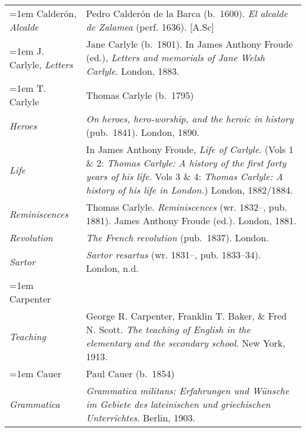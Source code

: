 \begin{xltabular}{\textwidth}{ lQ }
\hangindent=1em  Calderón, \textit{Alcalde} & Pedro Calderón de la Barca (b.~1600). \textit{El alcalde de Zalamea} (perf. 1636). [A.Sc] \\

\hangindent=1em  J. Carlyle, \textit{Letters} & Jane Carlyle (b.~1801). In James Anthony Froude (ed.), \textit{Letters and memorials of Jane Welsh Carlyle}. London, 1883. \\ %

\hangindent=1em  T. Carlyle & Thomas Carlyle (b.~1795) \\
\hspace{1em}\textit{Heroes} & \textit{On heroes, hero-worship, and the heroic in history} (pub.~1841). London, 1890. \\
\hspace{1em}\textit{Life} & In James Anthony Froude, \textit{Life of Carlyle}. (Vols 1 \& 2: \textit{Thomas Carlyle: A history of the first forty years of his life.} Vols 3 \& 4: \textit{Thomas Carlyle: A history of his life in London.}) London, 1882/1884. \\
\hspace{1em}\textit{Reminiscences} & Thomas Carlyle. \textit{Reminis\-cences} (wr. 1832--, pub. 1881). James Anthony Froude (ed.). London, 1881. \\
\hspace{1em}\textit{Revolution} & \textit{The French revolution} (pub.~1837). London. \\
\hspace{1em}\textit{Sartor} & \textit{Sartor resartus} (wr. 1831--, pub. 1833--34). London, n.d. \\

\hangindent=1em  Carpenter & \\
\hspace{1em}\textit{Teaching}& George R. Carpenter, Franklin T. Baker, \& Fred N. Scott. \textit{The teaching of English in the elementary and the secondary school}. New York, 1913.\\

\hangindent=1em  Cauer  & Paul Cauer (b.~1854)\\
\hspace{1em}\textit{Grammatica} & \textit{Grammatica militans: Erfahrungen und Wünsche im Gebiete des lateinischen und griechischen Unterrichtes}. Berlin, 1903. \\ %


\end{xltabular}

